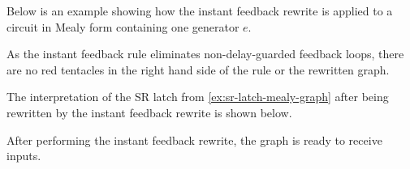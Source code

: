 \begin{example}\label{ex:instant-feedback-rewrite}
    Below is an example showing how the instant feedback rewrite is applied to
    a circuit in Mealy form containing one generator \(e\).
    \begin{center}
        
    \end{center}
\end{example}

As the instant feedback rule eliminates non-delay-guarded feedback loops, there
are no red tentacles in the right hand side of the rule or the rewritten graph.

\begin{example}\label{ex:sr-latch-instant-feedback-graph}
    The interpretation of the SR latch from \cref{ex:sr-latch-mealy-graph}
    after being rewritten by the instant feedback rewrite is shown below.
    \vspace{-1em}
    \begin{center}
    \end{center}
\end{example}

After performing the instant feedback rewrite, the graph is ready to receive
inputs.


